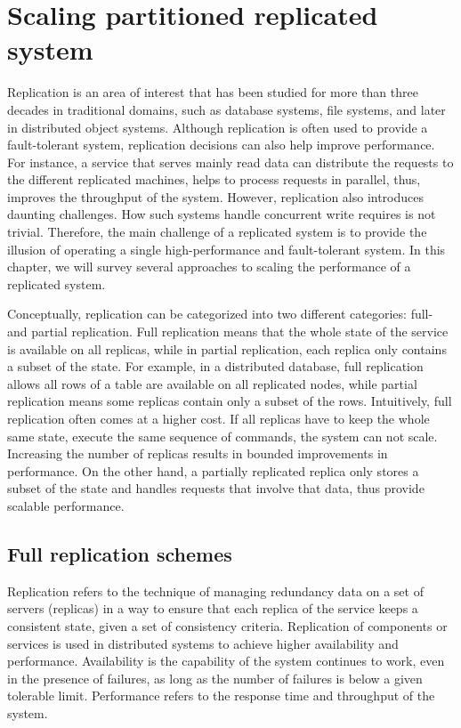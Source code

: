 \chapter[Scaling partitioned replicated system]{Scaling partitioned replicated system}

Replication is an area of interest that has been studied for more than three
decades in traditional domains, such as database systems, file systems, and
later in distributed object systems. Although replication is often used to
provide a fault-tolerant system, replication decisions can also help improve
performance. For instance, a service that serves mainly read data can distribute
the requests to the different replicated machines, helps to process requests in
parallel, thus, improves the throughput of the system. However, replication also
introduces daunting challenges. How such systems handle concurrent write requires
is not trivial. Therefore, the main challenge of a replicated system is to
provide the illusion of operating a single high-performance and fault-tolerant
system. In this chapter, we will survey several approaches to scaling the
performance of a replicated system.

Conceptually, replication can be categorized into two different categories:
full- and partial replication. Full replication means that the whole state of
the service is available on all replicas, while in partial replication, each
replica only contains a subset of the state. For example, in a distributed
database, full replication allows all rows of a table are available on all
replicated nodes, while partial replication means some replicas contain only a
subset of the rows. Intuitively, full replication often comes at a higher cost. If
all replicas have to keep the whole same state, execute the same sequence of
commands, the system can not scale. Increasing the number of replicas results in
bounded improvements in performance. On the other hand, a partially replicated
replica only stores a subset of the state and handles requests that involve that
data, thus provide scalable performance.

\section{Full replication schemes}

Replication refers to the technique of managing redundancy data on a set of
servers (replicas) in a way to ensure that each replica of the service keeps a
consistent state, given a set of consistency criteria. Replication of components
or services is used in distributed systems to achieve higher availability and
performance. Availability is the capability of the system continues to work,
even in the presence of failures, as long as the number of failures is below a
given tolerable limit. Performance refers to the response time and throughput of
the system.

